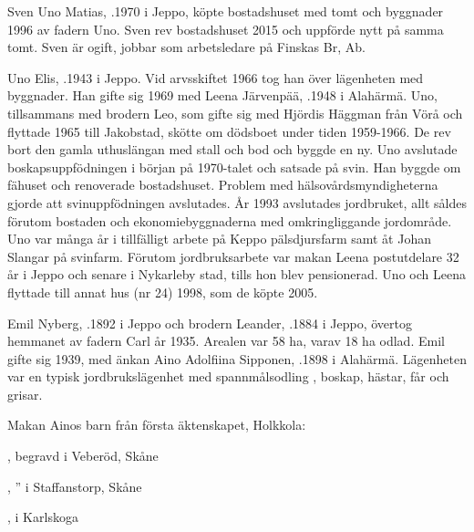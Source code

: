 
Sven Uno Matias, .1970 i Jeppo, köpte bostadshuset med tomt och byggnader 1996 av fadern Uno. Sven rev bostadshuset 2015 och uppförde nytt på samma tomt. Sven är ogift, jobbar som arbetsledare på Finskas Br, Ab.


Uno Elis, .1943 i Jeppo.  Vid arvsskiftet 1966 tog han över lägenheten med byggnader. Han gifte sig 1969 med Leena Järvenpää, .1948 i Alahärmä.  Uno, tillsammans med brodern Leo, som gifte sig med Hjördis Häggman från Vörå och flyttade 1965 till Jakobstad, skötte om  dödsboet under tiden 1959-1966. De rev bort den gamla uthuslängan med stall och bod och byggde en ny.  Uno  avslutade boskapsuppfödningen i början på 1970-talet och satsade på svin.  Han byggde om fähuset och renoverade bostadshuset. Problem med hälsovårdsmyndigheterna gjorde att svinuppfödningen avslutades. År 1993 avslutades jordbruket, allt såldes förutom bostaden och ekonomiebyggnaderna med omkringliggande jordområde. Uno var många år i tillfälligt arbete på Keppo pälsdjursfarm samt åt Johan Slangar på svinfarm. Förutom jordbruksarbete var makan Leena postutdelare 32 år i Jeppo och senare i Nykarleby stad, tills hon blev pensionerad. Uno och Leena flyttade till annat hus (nr 24) 1998, som de köpte 2005.
  \begin{jhchildren}
    \item {}
    \item {}
    \item {}
  \end{jhchildren}


Emil Nyberg, .1892 i Jeppo och brodern Leander, .1884 i Jeppo, övertog hemmanet av fadern Carl år 1935. Arealen var 58 ha, varav 18 ha odlad.  Emil gifte sig 1939, med änkan Aino Adolfiina Sipponen, .1898 i Alahärmä. Lägenheten var en typisk jordbrukslägenhet med spannmålsodling , boskap, hästar, får och grisar.
\begin{jhchildren}
  \item {}
  \item {}
\end{jhchildren}
Makan Ainos barn från första äktenskapet, Holkkola:
\begin{jhchildren}
  \item {}, begravd i Veberöd, Skåne
  \item {}, '' i Staffanstorp, Skåne
  \item {}, i Karlskoga
\end{jhchildren}

